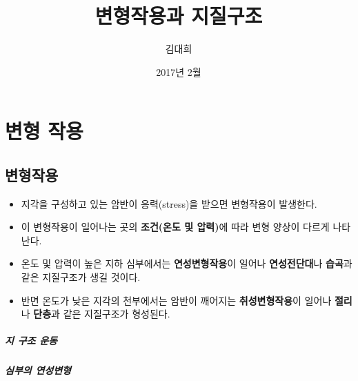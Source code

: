 \documentclass[12pt, a4paper, oneside]{book}
\begin{document}
	
			\dominitoc
			

			\title{변형작용과 지질구조}
			\author{김대희}
			\date{2017년 2월}
			\maketitle


			\tableofcontents

			


	\clearpage
	\chapter{변형 작용}


	\clearpage
	\section{변형작용}



	

			\begin{itemize}[	topsep=0.0em, itemsep=0.0em, leftmargin=4em, labelsep=3em ] 
			\item	지각을 구성하고 있는 암반이 응력(stress)을 받으면 변형작용이 발생한다.
			\item	이 변형작용이 일어나는 곳의 \textbf{조건(온도 및 압력)}에 따라 	변형 양상이 다르게 나타난다.
			\item	온도 및 압력이 높은 지하 심부에서는 \textbf{연성변형작용}이 일어나 \textbf{연성전단대}나 \textbf{습곡}과 같은 지질구조가 생길 것이다. 
			\item	반면 온도가 낮은 지각의 천부에서는 암반이 깨어지는 \textbf{취성변형작용}이 일어나 
					\textbf{절리}나 \textbf{단층}과 같은 지질구조가 형성된다.
			\end{itemize}	



		\paragraph{지 구조 운동}




		\paragraph{심부의 연성변형}
\end{document}
